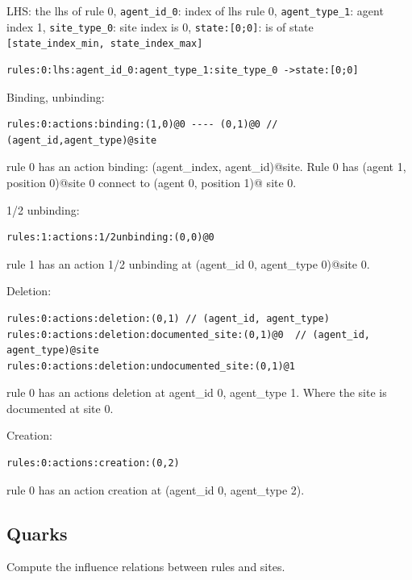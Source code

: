 \documentclass{article}
\begin{document}
\begin{i}
\item LHS: the lhs of rule 0, \verb|agent_id_0|: index of lhs rule 0,
  \verb|agent_type_1|: agent index 1, \verb|site_type_0|: site index is 0,
  \verb|state:[0;0]|: is of state \verb|[state_index_min, state_index_max]|
\begin{verbatim}
rules:0:lhs:agent_id_0:agent_type_1:site_type_0 ->state:[0;0]
\end{verbatim}

\item Binding, unbinding:

\begin{verbatim}
rules:0:actions:binding:(1,0)@0 ---- (0,1)@0 // (agent_id,agent_type)@site
\end{verbatim}

  rule 0 has an action binding: (agent\_index, agent\_id)@site. Rule 0 has
  (agent 1, position 0)@site 0 connect to (agent 0, position 1)@ site 0.

\item 1/2 unbinding:

\begin{verbatim}
rules:1:actions:1/2unbinding:(0,0)@0
\end{verbatim}

rule 1 has an action 1/2 unbinding at (agent\_id 0, agent\_type 0)@site 0.

\item Deletion:

\begin{verbatim}
rules:0:actions:deletion:(0,1) // (agent_id, agent_type)
rules:0:actions:deletion:documented_site:(0,1)@0  // (agent_id, agent_type)@site
rules:0:actions:deletion:undocumented_site:(0,1)@1
\end{verbatim}

  rule 0 has an actions deletion at agent\_id 0, agent\_type 1. Where the
  site is documented at site 0.

\item Creation:
\begin{verbatim}
rules:0:actions:creation:(0,2)
\end{verbatim}

rule 0 has an action creation at (agent\_id 0, agent\_type 2).

\end{i}

\subsection{Quarks}
Compute the influence relations between rules and sites.
\end{document}
